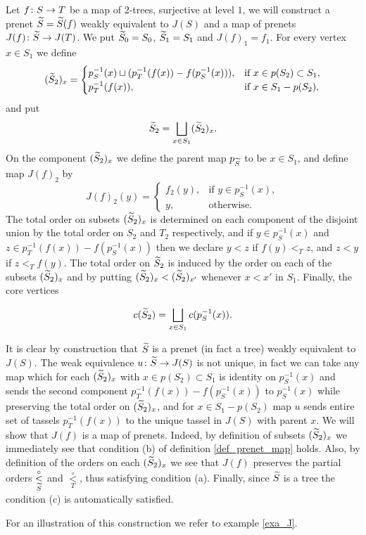 \documentclass[letterpaper,12pt,leqno]{article}
\numberwithin{equation}{theorem}
\def\lesub{\mathop{<}\limits}
\def\pless{\lesub^\circ}
\begin{document}
\begin{nparagraph}
\label{par_J_map}
Let $f\colon S \to T$ be a map of $2$-trees, surjective at level $1$, we will construct a prenet $\widetilde S = \widetilde S(f)$ weakly equivalent to $J(S)$ and a map of prenets
$J(f)\colon \widetilde S \to J(T)$. We put $\widetilde S_0 = S_0$, $\widetilde S_1 = S_1$ and $J(f)_1 = f_1$. For every vertex $x \in S_1$ we define
$$
(\widetilde S_2)_x = \begin{cases}
p_S^{-1}(x) \sqcup (p_T^{-1}(f(x)) - f(p_S^{-1}(x))),&\text{if $x \in p(S_2) \subset S_1$}, \\
p_T^{-1}(f(x)),&\text{if $x \in S_1 - p(S_2)$},
\end{cases}
$$
and put
$$
\widetilde S_2 = \bigsqcup_{x \in S_1} (\widetilde S_2)_x.
$$
On the component $(\widetilde S_2)_x$ we define the parent map $p_{\widetilde S}$ to be $x \in S_1$, and define map $J(f)_2$ by
$$
J(f)_2(y) = \begin{cases}
f_2(y),&\text{if $y \in p_S^{-1}(x)$},\\
y,&\text{otherwise}.
\end{cases}
$$
The total order on subsets $(\widetilde S_2)_x$ is determined on each component of the disjoint union by the total order on $S_2$ and $T_2$ respectively,
and if $y \in p_S^{-1}(x)$ and $z \in p_T^{-1}(f(x)) - f(p_S^{-1}(x))$ then we declare $y < z$ if $f(y) <_T z$, and $z < y$ if $z <_T f(y)$. The total order on $\widetilde S_2$ is
induced by the order on each of the subsets $(\widetilde S_2)_x$ and by putting $(\widetilde S_2)_x < (\widetilde S_2)_{x'}$ whenever $x < x'$ in $S_1$. Finally, the core vertices

$$
c(\widetilde S_2) = \bigsqcup_{x \in S_1} c(p_S^{-1}(x)).
$$


It is clear by construction that $\widetilde S$ is a prenet (in fact a tree) weakly equivalent to $J(S)$. The weak equivalence $u\colon \widetilde S \to J(S)$ is not unique, in fact we
can take any map which for each $(\widetilde S_2)_x$ with $x \in p(S_2) \subset S_1$ is identity on $p_S^{-1}(x)$ and sends the second component $p_T^{-1}(f(x)) - f(p_S^{-1}(x))$ to $p_S^{-1}(x)$ while preserving the total order on
$(\widetilde S_2)_x$, and for $x \in S_1 - p(S_2)$ map $u$ sends entire set of tassels $p_T^{-1}(f(x))$ to the unique tassel in $J(S)$ with parent $x$.
We will show that $J(f)$ is a map of prenets. Indeed, by definition of subsets
$(\widetilde S_2)_x$ we immediately see that condition (b) of definition \ref{def_prenet_map} holds. Also, by definition of the orders
on each $(\widetilde S_2)_x$ we see that $J(f)$ preserves the partial orders $\pless_{\wtilde S}$ and $\pless_T$, thus satisfying condition (a). Finally, since $\widetilde S$ is a tree
the condition (c) is automatically satisfied.

For an illustration of this construction we refer to example \ref{exa_J}.
\end{nparagraph}
\end{document}
